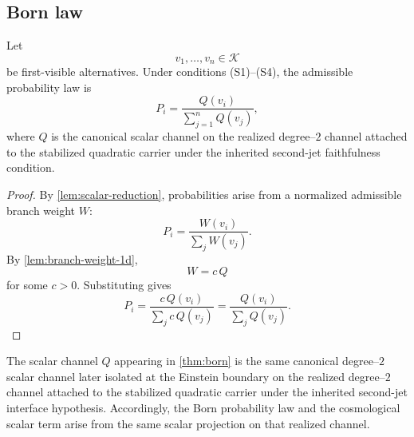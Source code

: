 \subsection{Born law}
\begin{theorem}
	\label{thm:born}
	Let
	\[
		v_1,\dots,v_n\in\mathcal K
	\]
	be first-visible alternatives.  Under conditions
	\textup{(S1)--(S4)}, the admissible probability law is
	\[
		P_i=\frac{Q(v_i)}{\sum_{j=1}^n Q(v_j)},
	\]
	where \(Q\) is the canonical scalar channel on the realized
	degree--\(2\) channel attached to the stabilized quadratic carrier
	under the inherited second-jet faithfulness condition.
\end{theorem}
\begin{proof}
	By \cref{lem:scalar-reduction}, probabilities arise from a normalized
	admissible branch weight \(W\):
	\[
		P_i=\frac{W(v_i)}{\sum_j W(v_j)}.
	\]
	By \cref{lem:branch-weight-1d},
	\[
		W=c\,Q
	\]
	for some \(c>0\).  Substituting gives
	\[
		P_i
		=
		\frac{c\,Q(v_i)}{\sum_j c\,Q(v_j)}
		=
		\frac{Q(v_i)}{\sum_j Q(v_j)}.
	\]
\end{proof}
\begin{remark}
	The scalar channel \(Q\) appearing in \cref{thm:born} is the same
	canonical degree--\(2\) scalar channel later isolated at the Einstein
	boundary on the realized degree--\(2\) channel attached to the
	stabilized quadratic carrier under the inherited second-jet interface
	hypothesis.  Accordingly, the Born probability law and the
	cosmological scalar term arise from the same scalar projection on that
	realized channel.
\end{remark}
